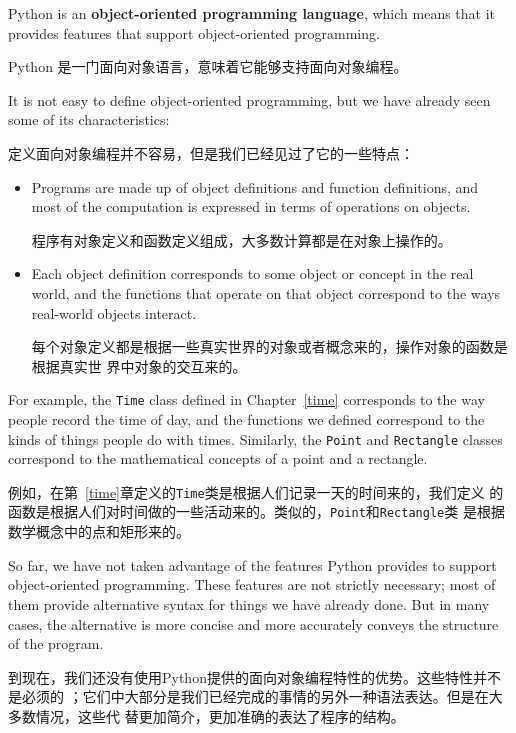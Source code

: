 \documentclass[10pt]{book}
\begin{document}
\begin{CJK}{UTF8}{gbsn}
Python is an {\bf object-oriented programming language}, which means
that it provides features that support object-oriented
programming.

Python 是一门面向对象语言，意味着它能够支持面向对象编程。

It is not easy to define object-oriented programming, but we have
already seen some of its characteristics:

定义面向对象编程并不容易，但是我们已经见过了它的一些特点：

\begin{itemize}

\item Programs are made up of object definitions and function
definitions, and most of the computation is expressed in terms
of operations on objects.

程序有对象定义和函数定义组成，大多数计算都是在对象上操作的。

\item Each object definition corresponds to some object or concept
in the real world, and the functions that operate on that object
correspond to the ways real-world objects interact.

每个对象定义都是根据一些真实世界的对象或者概念来的，操作对象的函数是根据真实世
界中对象的交互来的。

\end{itemize}

For example, the {\tt Time} class defined in Chapter~\ref{time}
corresponds to the way people record the time of day, and the
functions we defined correspond to the kinds of things people do with
times.  Similarly, the {\tt Point} and {\tt Rectangle} classes
correspond to the mathematical concepts of a point and a rectangle.

例如，在第~\ref{time}章定义的{\tt Time}类是根据人们记录一天的时间来的，我们定义
的函数是根据人们对时间做的一些活动来的。类似的，{\tt Point}和{\tt Rectangle}类
是根据数学概念中的点和矩形来的。

So far, we have not taken advantage of the features Python provides to
support object-oriented programming.  These
features are not strictly necessary; most of them provide
alternative syntax for things we have already done.  But in many cases,
the alternative is more concise and more accurately conveys the
structure of the program.

到现在，我们还没有使用Python提供的面向对象编程特性的优势。这些特性并不是必须的
；它们中大部分是我们已经完成的事情的另外一种语法表达。但是在大多数情况，这些代
替更加简介，更加准确的表达了程序的结构。


\end{CJK}
\end{document}
